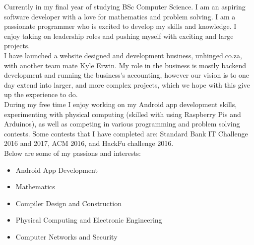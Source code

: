 %
%
\newpage
{}
    Currently in my final year of studying BSc Computer Science. I am an aspiring software developer with a love for mathematics and problem solving. I am a passionate programmer who is excited to develop my skills and knowledge. I enjoy taking on leadership roles and pushing myself with exciting and large projects. \\

    I have launched a website designed and development business, \href{www.unhinged.co.za}{\underline{unhinged.co.za}}, with another team mate Kyle Erwin. My role in the business is mostly backend development and running the business's accounting, however our vision is to one day extend into larger, and more complex projects, which we hope with this give up the experience to do.\\

    During my free time I enjoy working on my Android app development skills, experimenting with physical computing (skilled with using Raspberry Pis and Arduinos), as well as competing in various programming and problem solving contests. Some contests that I have completed are: Standard Bank IT Challenge 2016 and 2017, ACM 2016, and HackFu challenge 2016.\\

    \noindent
    Below are some of my passions and interests:
    \begin{itemize}
        \item Android App Development
        \item Mathematics
        \item Compiler Design and Construction
        \item Physical Computing and Electronic Engineering
        \item Computer Networks and Security
    \end{itemize}
